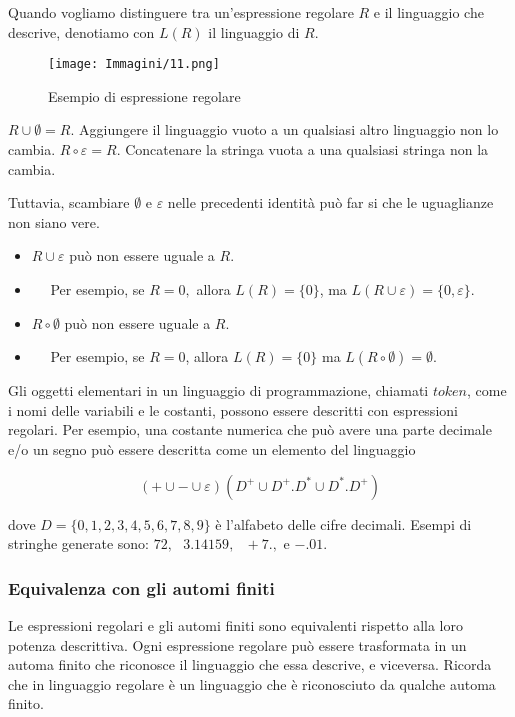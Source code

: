 \documentclass{article}
\begin{document}
Quando vogliamo distinguere tra un'espressione regolare $R$ e il linguaggio
che descrive, denotiamo con $L(R)$ il linguaggio di $R$.

\begin{figure}[H]
    \centering
    \texttt{[image: Immagini/11.png]}
    \caption{Esempio di espressione regolare}
    \label{fig:regular_expression_example1}
\end{figure}
\vspace{1em}
\text{}
\newline
$R \cup \emptyset = R.$
Aggiungere il linguaggio vuoto a un qualsiasi altro linguaggio non lo cambia.
\newline
$R\circ \varepsilon = R$.
Concatenare la stringa vuota a una qualsiasi stringa non la cambia.

Tuttavia, scambiare $\emptyset$ e $\varepsilon$ nelle precedenti identità può far si che le uguaglianze non siano vere.
\begin{itemize}
    \item $R \cup \varepsilon$ può non essere uguale a $R$.
    \item $\quad$ Per esempio, se $R = 0,$ allora $L(R) = \{0\}$, ma $L(R \cup \varepsilon) = \{0, \varepsilon\}$.
    \item $R \circ \emptyset$ può non essere uguale a $R$.
    \item $\quad$ Per esempio, se $R = 0$, allora $L(R) = \{0\}$ ma $L(R \circ \emptyset) = \emptyset$.
\end{itemize}

Gli oggetti elementari in un linguaggio di programmazione, chiamati $token$, come i nomi delle variabili e le costanti, possono essere descritti con espressioni regolari. Per esempio, una costante numerica che può avere una parte decimale e/o un segno può essere descritta come un elemento del linguaggio

$$(+ \cup - \cup \varepsilon)(D^{+}\cup D^{+}.D^{*}\cup D^{*}.D^{+})$$

dove $D = \{0,1,2,3,4,5,6,7,8,9\}$ è l'alfabeto delle cifre decimali. Esempi di stringhe generate sono: $72,\text{ }3.14159,\text{ }+7.,$ e $-.01.$

\subsubsection{Equivalenza con gli automi finiti}

Le espressioni regolari e gli automi finiti sono equivalenti rispetto alla loro potenza descrittiva. Ogni espressione regolare può essere trasformata in un automa finito che riconosce il linguaggio che essa descrive, e viceversa. Ricorda che in linguaggio regolare è un linguaggio che è riconosciuto da qualche automa finito.
\vspace{4em}
\end{document}
